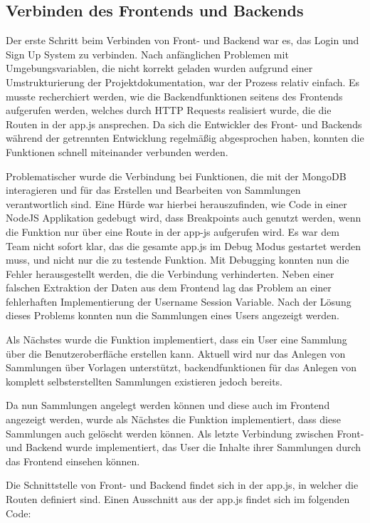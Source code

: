 \subsection{Verbinden des Frontends und Backends}\label{subsec:verbinden-des-frontends-und-backends}

Der erste Schritt beim Verbinden von Front- und Backend war es, das Login und Sign Up System zu verbinden.
Nach anfänglichen Problemen mit Umgebungsvariablen, die nicht korrekt geladen wurden aufgrund einer Umstrukturierung der Projektdokumentation, war der Prozess relativ einfach.
Es musste recherchiert werden, wie die Backendfunktionen seitens des Frontends aufgerufen werden, welches durch HTTP Requests realisiert wurde, die die Routen in der app.js ansprechen.
Da sich die Entwickler des Front- und Backends während der getrennten Entwicklung regelmäßig abgesprochen haben, konnten die Funktionen schnell miteinander verbunden werden.

Problematischer wurde die Verbindung bei Funktionen, die mit der MongoDB interagieren und für das Erstellen und Bearbeiten von Sammlungen verantwortlich sind.
Eine Hürde war hierbei herauszufinden, wie Code in einer NodeJS Applikation gedebugt wird, dass Breakpoints auch genutzt werden, wenn die Funktion nur über eine Route in der app-js aufgerufen wird.
Es war dem Team nicht sofort klar, das die gesamte app.js im Debug Modus gestartet werden muss, und nicht nur die zu testende Funktion.
Mit Debugging konnten nun die Fehler herausgestellt werden, die die Verbindung verhinderten.
Neben einer falschen Extraktion der Daten aus dem Frontend lag das Problem an einer fehlerhaften Implementierung der Username Session Variable.
Nach der Lösung dieses Problems konnten nun die Sammlungen eines Users angezeigt werden.

Als Nächstes wurde die Funktion implementiert, dass ein User eine Sammlung über die Benutzeroberfläche erstellen kann.
Aktuell wird nur das Anlegen von Sammlungen über Vorlagen unterstützt, backendfunktionen für das Anlegen von komplett selbsterstellten Sammlungen existieren jedoch bereits.

Da nun Sammlungen angelegt werden können und diese auch im Frontend angezeigt werden, wurde als Nächstes die Funktion implementiert, dass diese Sammlungen auch gelöscht werden können.
Als letzte Verbindung zwischen Front- und Backend wurde implementiert, das User die Inhalte ihrer Sammlungen durch das Frontend einsehen können.

Die Schnittstelle von Front- und Backend findet sich in der app.js, in welcher die Routen definiert sind.
Einen Ausschnitt aus der app.js findet sich im folgenden Code:
\vspace{1em}

\vspace{1em}
\newpage
